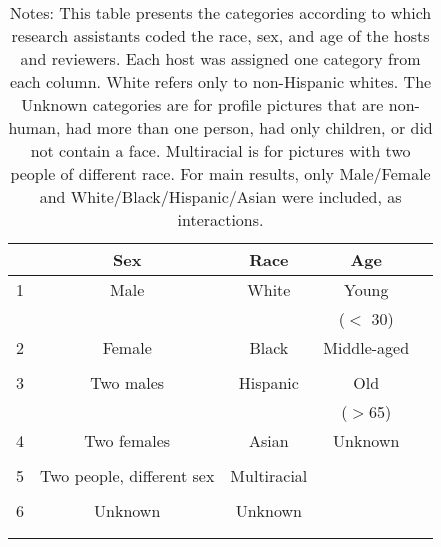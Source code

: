 {
\def\sym#1{\ifmmode^{#1}\else\(^{#1}\)\fi}
\begin{longtable}{l*{4}{c}}
\caption{Coding categories} \label{table:coding}\\
\hline\hline\endfirsthead\hline\endhead\hline\endfoot\endlastfoot
                    &\multicolumn{1}{c}{Sex}&\multicolumn{1}{c}{Race}&\multicolumn{1}{c}{Age}\\
\hline

1          &           Male         &           White         &           Young      \\ 
                    &                 &                  &          ($<$ 30)      \\
[1em]
2        &      Female  &      Black  &       Middle-aged     \\
                    &              &              &         \\
[1em]
3    &       Two males        &      Hispanic &       Old    \\
                    &              &              &     ($>$65)       \\
[1em]
4          &      Two females        &      Asian         &     Unknown      \\
                    &              &              &          \\
[1em]
5        &      Two people, different sex         &      Multiracial         &       \\
                    &              &              &       \\
[1em]
6    &       Unknown        &       Unknown  &        \\
                    &             &              &             \\
\hline\hline

\caption*{Notes: This table presents the categories according to which research assistants coded the race, sex, and age of the hosts and reviewers. Each host was assigned one category from each column. White refers only to non-Hispanic whites. The Unknown categories are for profile pictures that are non-human, had more than one person, had only children, or did not contain a face. Multiracial is for pictures with two people of different race. For main results, only Male/Female and White/Black/Hispanic/Asian were included, as interactions.}
\label{Table 1}


\end{longtable}
}
